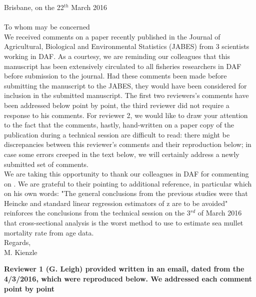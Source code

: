 \documentclass[11pt]{article}
\begin{document}
\begin{spacing}{1.2} 
\hspace{9cm} Brisbane, on the 22$^{th}$ March 2016 \\ \\

\noindent To whom may be concerned \\

We received comments on a paper \citep{Kienzle2015} recently published in the Journal of Agricultural, Biological and Environmental Statistics (JABES) from 3 scientists working in DAF. As a courtesy, we are reminding our colleagues that this manuscript has been extensively circulated to all fisheries researchers in DAF before submission to the journal. Had these comments been made before submitting the manuscript to the JABES, they would have been considered for inclusion in the submitted manuscript. The first two reviewers's comments have been addressed below point by point, the third reviewer did not require a response to his comments. For reviewer 2, we would like to draw your attention to the fact that the comments, hastly, hand-written on a paper copy of the publication during a technical session are difficult to read: there might be discrepancies between this reviewer's comments and their reproduction below; in case some errors creeped in the text below, we will certainly address a newly submitted set of comments. \\

We are taking this opportunity to thank our colleagues in DAF for commenting on \cite{Kienzle2015}. We are grateful to their pointing to additional reference, in particular \cite{Millar2015BetterMortalityRateEstimator} which on his own words: "The general conclusions from the previous studies were that Heincke and standard linear regression estimators of z are to be avoided" reinforces the conclusions from the technical session on the 3$^{rd}$ of March 2016 that cross-sectional analysis is the worst method to use to estimate sea mullet mortality rate from age data.\\

\noindent Regards,\\
\noindent M. Kienzle \\
\vspace{0.2cm}


{\bf Reviewer 1 (G. Leigh) provided written in an email, dated from the 4/3/2016, which were reproduced below. We addressed each comment point by point}\\


\end{spacing}
\end{document}
